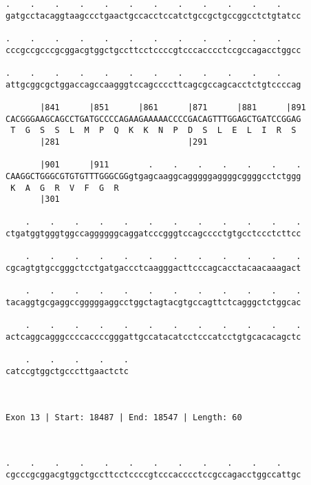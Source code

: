 \documentclass{article}
\begin{document}
\begin{Verbatim}
.    .    .    .    .    .    .    .    .    .    .    .    
gatgcctacaggtaagccctgaactgccacctccatctgccgctgccggcctctgtatcc
                                                            
.    .    .    .    .    .    .    .    .    .    .    .    
cccgccgcccgcggacgtggctgccttcctccccgtcccacccctccgccagacctggcc
                                                            
.    .    .    .    .    .    .    .    .    .    .    .    
attgcggcgctggaccagccaagggtccagccccttcagcgccagcacctctgtccccag
                                                            
       |841      |851      |861      |871      |881      |891
CACGGGAAGCAGCCTGATGCCCCAGAAGAAAAACCCCGACAGTTTGGAGCTGATCCGGAG
 T  G  S  S  L  M  P  Q  K  K  N  P  D  S  L  E  L  I  R  S 
       |281                          |291                   
  
       |901      |911        .    .    .    .    .    .    .
CAAGGCTGGGCGTGTGTTTGGGCGGgtgagcaaggcagggggaggggcggggcctctggg
 K  A  G  R  V  F  G  R                                     
       |301                                                 
  
    .    .    .    .    .    .    .    .    .    .    .    .
ctgatggtgggtggccaggggggcaggatcccgggtccagcccctgtgcctccctcttcc
                                                            
    .    .    .    .    .    .    .    .    .    .    .    .
cgcagtgtgccgggctcctgatgaccctcaagggacttcccagcacctacaacaaagact
                                                            
    .    .    .    .    .    .    .    .    .    .    .    .
tacaggtgcgaggccgggggaggcctggctagtacgtgccagttctcagggctctggcac
                                                            
    .    .    .    .    .    .    .    .    .    .    .    .
actcaggcagggccccaccccgggattgccatacatcctcccatcctgtgcacacagctc
                                                            
    .    .    .    .    .
catccgtggctgcccttgaactctc
                         
                         
 
Exon 13 | Start: 18487 | End: 18547 | Length: 60



.    .    .    .    .    .    .    .    .    .    .    .    
cgcccgcggacgtggctgccttcctccccgtcccacccctccgccagacctggccattgc
                                                            

\end{Verbatim}
\end{document}
